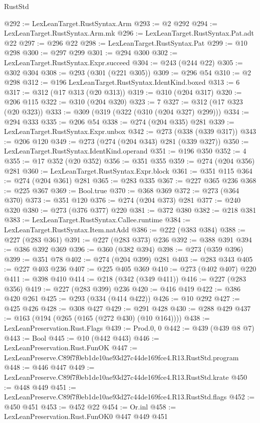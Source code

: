 \begin{lexlean}{RustStd}
\begin{coremodule}
@292 := LexLeanTarget.RustSyntax.Arm
@293 := @2 @292
@294 := LexLeanTarget.RustSyntax.Arm.mk
@296 := LexLeanTarget.RustSyntax.Pat.adt @22
@297 := @296 @22
@298 := LexLeanTarget.RustSyntax.Pat
@299 := @10 @298
@300 := @297 @299
@301 := @294 @300
@302 := LexLeanTarget.RustSyntax.Expr.succeed
@304 := @243 (@244 @22)
@305 := @302 @304
@308 := @293 (@301 (@221 @305))
@309 := @296 @54
@310 := @2 @298
@312 := @196 LexLeanTarget.RustSyntax.IdentKind.boxed
@313 := 6
@317 := @312 (@17 @313 (@20 @313))
@319 := @310 (@204 @317)
@320 := @206 @115
@322 := @310 (@204 @320)
@323 := 7
@327 := @312 (@17 @323 (@20 @323))
@333 := @309 (@319 (@322 (@310 (@204 @327) @299)))
@334 := @294 @333
@335 := @206 @54
@338 := @274 (@204 @335) @281
@339 := LexLeanTarget.RustSyntax.Expr.unbox
@342 := @273 (@338 (@339 @317))
@343 := @206 @120
@349 := @273 (@274 (@204 @343) @281 (@339 @327))
@350 := LexLeanTarget.RustSyntax.IdentKind.operand
@351 := @196 @350
@352 := 4
@355 := @17 @352 (@20 @352)
@356 := @351 @355
@359 := @274 (@204 @356) @281
@360 := LexLeanTarget.RustSyntax.Expr.block
@361 := @351 @115
@364 := @274 (@204 @361) @281
@365 := @283 @335
@367 := @227 @365 @236
@368 := @225 @367
@369 := Bool.true
@370 := @368 @369
@372 := @273 (@364 @370)
@373 := @351 @120
@376 := @274 (@204 @373) @281
@377 := @240 @320
@380 := @273 (@376 @377) @220
@381 := @372 @380
@382 := @218 @381
@383 := LexLeanTarget.RustSyntax.Callee.runtime
@384 := LexLeanTarget.RustSyntax.Item.natAdd
@386 := @222 (@383 @384)
@388 := @227 (@283 @361)
@391 := @227 (@283 @373) @236
@392 := @388 @391
@394 := @386 @392 @369
@396 := @360 (@382 @394)
@398 := @273 (@359 @396)
@399 := @351 @78
@402 := @274 (@204 @399) @281
@403 := @283 @343
@405 := @227 @403 @236
@407 := @225 @405 @369
@410 := @273 (@402 @407) @220
@411 := @398 @410
@414 := @218 (@342 (@349 @411))
@416 := @227 (@283 @356)
@419 := @227 (@283 @399) @236
@420 := @416 @419
@422 := @386 @420 @261
@425 := @293 (@334 (@414 @422))
@426 := @10 @292
@427 := @425 @426
@428 := @308 @427
@429 := @291 @428
@430 := @288 @429
@437 := @163 (@194 (@265 (@165 (@272 @430) (@10 @164))))
@438 := LexLeanPreservation.Rust.Flags
@439 := Prod.{0, 0}
@442 := @439 (@439 @8 @7)
@443 := Bool
@445 := @10 (@442 @443)
@446 := LexLeanPreservation.Rust.FunOK
@447 := LexLeanPreserve.C89f7f0eb1de10ae93d27c44de169fce4.R13.RustStd.program
@448 := @446 @447
@449 := LexLeanPreserve.C89f7f0eb1de10ae93d27c44de169fce4.R13.RustStd.krate
@450 := @448 @449
@451 := LexLeanPreserve.C89f7f0eb1de10ae93d27c44de169fce4.R13.RustStd.flags
@452 := @450 @451
@453 := @452 @22
@454 := Or.inl
@458 := LexLeanPreservation.Rust.FunOK0 @447 @449 @451

\end{coremodule}
\end{lexlean}
